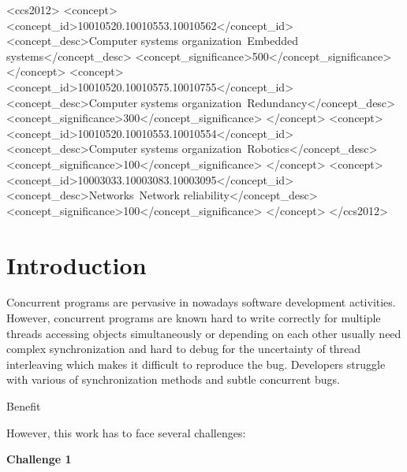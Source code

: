 \documentclass{sig-alternate-05-2015}
\begin{document}
%
%
\begin{CCSXML}
<ccs2012>
 <concept>
  <concept_id>10010520.10010553.10010562</concept_id>
  <concept_desc>Computer systems organization~Embedded systems</concept_desc>
  <concept_significance>500</concept_significance>
 </concept>
 <concept>
  <concept_id>10010520.10010575.10010755</concept_id>
  <concept_desc>Computer systems organization~Redundancy</concept_desc>
  <concept_significance>300</concept_significance>
 </concept>
 <concept>
  <concept_id>10010520.10010553.10010554</concept_id>
  <concept_desc>Computer systems organization~Robotics</concept_desc>
  <concept_significance>100</concept_significance>
 </concept>
 <concept>
  <concept_id>10003033.10003083.10003095</concept_id>
  <concept_desc>Networks~Network reliability</concept_desc>
  <concept_significance>100</concept_significance>
 </concept>
</ccs2012>  
\end{CCSXML}



%
%

%
%
\printccsdesc



\section{Introduction}
Concurrent programs are pervasive in nowadays software development activities. However, concurrent programs are known hard to write correctly for multiple threads accessing objects simultaneously or depending on each other usually need complex synchronization and hard to debug for the uncertainty of thread interleaving which makes it difficult to reproduce the bug. Developers struggle with various of synchronization methods and subtle concurrent bugs.

Benefit

However, this work has to face several challenges:

\textbf{Challenge 1} 
\end{document}
